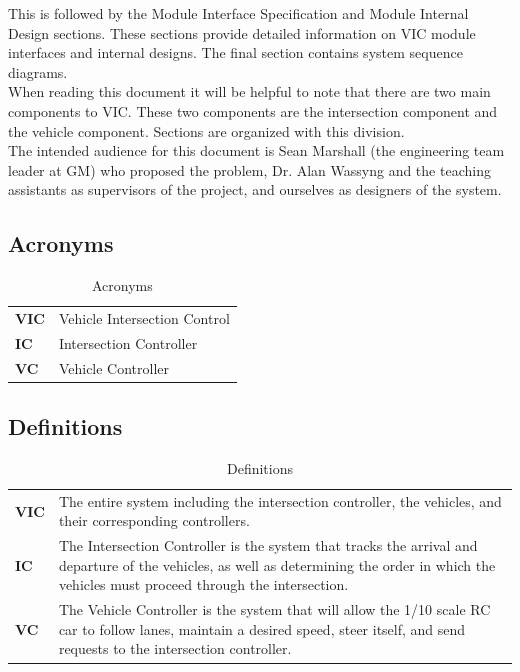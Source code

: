 \documentclass [10pt]{article}
\begin{document}
This is followed by the Module Interface Specification and Module Internal Design sections. These sections provide detailed information on VIC module interfaces and internal designs. The final section contains system sequence diagrams. \\


When reading this document it will be helpful to note that there are two main components to VIC. These two components are the intersection component and the vehicle component.  Sections are organized with this division.   \\

The intended audience for this document is Sean Marshall (the engineering team leader at GM) who proposed the problem, Dr. Alan Wassyng and the teaching assistants as supervisors of the project, and ourselves as designers of the system.


\subsection{Acronyms}

\begin{longtable}{ |p{ } p{ }|} \caption{Acronyms} \\ \hline


\textbf{VIC} & Vehicle Intersection Control \\ 

\cellcolor{tableCell}\textbf{IC}  & \cellcolor{tableCell}Intersection Controller \\

\textbf{VC} &Vehicle Controller\\\hline


\end{longtable}

\subsection{Definitions}

\begin{longtable}{ |p{ } p{ }|} \caption{Definitions} \\ \hline


\textbf{VIC} & The entire system including the intersection controller, the vehicles, and their corresponding controllers. \\ 

\rowcolor{tableCell}\textbf{IC}  & The Intersection Controller is the system that tracks the arrival and departure of the vehicles, as well as determining the order in which the vehicles must proceed through the intersection.\\

\textbf{VC} & The Vehicle Controller is the system that will allow the 1/10 scale RC car to follow lanes, maintain a desired speed, steer itself, and send requests to the intersection controller. \\\hline


\end{longtable}
\end{document}
